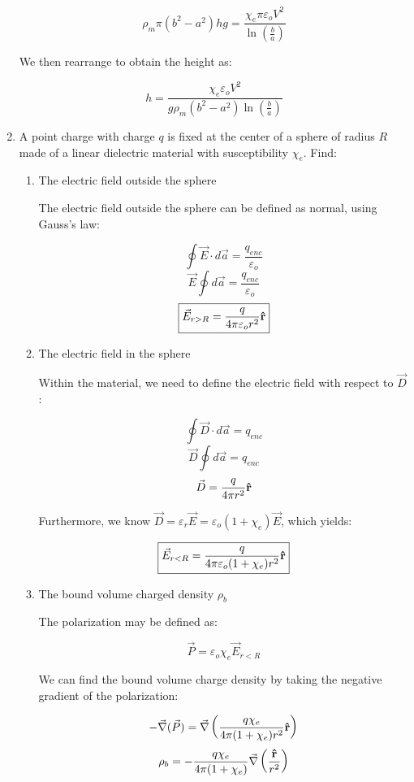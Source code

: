 \begin{enumerate}
    $$\rho_m\pi\left( b^2-a^2 \right)hg=\frac{\chi_e\pi\varepsilon_oV^2}{\ln\left( \frac{b}{a} \right)}$$

    We then rearrange to obtain the height as:

    $$\boxed{h=\frac{\chi_e\varepsilon_o V^2}{g\rho_m(b^2-a^2)\ln\left( \frac{b}{a} \right)}}$$

  \item A point charge with charge $q$ is fixed at the center of a sphere of radius $R$ made of a linear dielectric material with susceptibility $\chi_e$. Find:

    \begin{enumerate}

      \item The electric field outside the sphere

        The electric field outside the sphere can be defined as normal, using Gauss's law:

        $$\oint \vec{E}\cdot d\vec{a}=\frac{q_{enc}}{\varepsilon_o}$$
        $$\vec{E}\oint d\vec{a}=\frac{q_{enc}}{\varepsilon_o}$$
        $$\boxed{\vec{E}_{r>R}=\frac{q}{4\pi\varepsilon_o r^2}\bold{\hat{r}}}$$

      \item The electric field in the sphere

        Within the material, we need to define the electric field with respect to $\vec{D}$:

        $$\oint \vec{D}\cdot d\vec{a}=q_{enc}$$
        $$\vec{D}\oint d\vec{a}=q_{enc}$$
        $$\vec{D}=\frac{q}{4\pi r^2}\bold{\hat{r}}$$

        Furthermore, we know $\vec{D}=\varepsilon_r\vec{E}=\varepsilon_o(1+\chi_e)\vec{E}$, which yields:

        $$\boxed{\vec{E}_{r<R}=\frac{q}{4\pi\varepsilon_o(1+\chi_e)r^2}\bold{\hat{r}}}$$

      \item The bound volume charged density $\rho_b$

        The polarization may be defined as:

        $$\vec{P}=\varepsilon_o\chi_e\vec{E}_{r<R}$$

        We can find the bound volume charge density by taking the negative gradient of the polarization:

        $$-\vec{\nabla}(\vec{P})=\vec{\nabla}\left( \frac{q\chi_e}{4\pi(1+\chi_e)r^2}\bold{\hat{r}} \right)$$
        $$\rho_b=-\frac{q\chi_e}{4\pi(1+\chi_e)}\vec{\nabla}\left( \frac{\bold{\hat{r}}}{r^2} \right)$$


\end{enumerate}
\end{enumerate}

